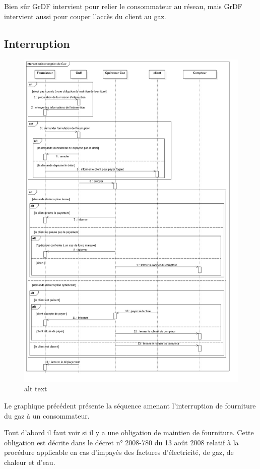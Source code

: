 \documentclass[
12pt,
french,                           %
a4paper,
]{article}
\begin{document}
Bien sûr GrDF intervient pour relier le consommateur au réseau, mais
GrDF intervient aussi pour couper l'accès du client au gaz.

\subsection{Interruption}

\begin{figure}[htbp]
\centering
\includegraphics{DS-interruptionFournitureGaz.jpg}
\caption{alt text}
\end{figure}

Le graphique précédent présente la séquence amenant l'interruption de
fourniture du gaz à un consommateur.

Tout d'abord il faut voir si il y a une obligation de maintien de
fourniture. Cette obligation est décrite dans le décret n° 2008-780 du
13 août 2008 relatif à la procédure applicable en cas d'impayés des
factures d'électricité, de gaz, de chaleur et d'eau.
\end{document}
